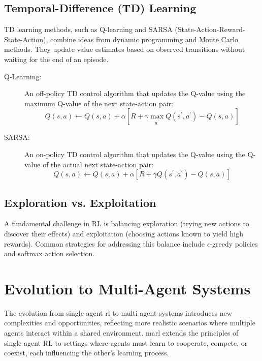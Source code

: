 \subsection*{Temporal-Difference (TD) Learning}
TD learning methods, such as Q-learning and SARSA (State-Action-Reward-State-Action), 
combine ideas from dynamic programming and Monte Carlo methods. They update 
value estimates based on observed transitions without waiting for the end of an episode.
\begin{description}
    \item[Q-Learning:] An off-policy TD control algorithm that updates the Q-value using the 
        maximum Q-value of the next state-action pair:
        \begin{equation}
            Q(s, a) \leftarrow Q(s, a) 
            + \alpha \left[ R + \gamma \max_{a^\prime} Q(s^\prime, a^\prime) - Q(s, a) \right]
        \end{equation}
    \item[SARSA:] An on-policy TD control algorithm that updates the Q-value using the Q-value of 
        the actual next state-action pair:
        \begin{equation}
            Q(s, a) \leftarrow Q(s, a) 
            + \alpha \left[ R + \gamma Q(s^\prime, a^\prime) - Q(s, a) \right]
        \end{equation}
\end{description}

\subsection*{Exploration vs. Exploitation}
A fundamental challenge in RL is balancing exploration (trying new actions to discover their 
effects) and exploitation (choosing actions known to yield high rewards). 
Common strategies for addressing this balance include \(\epsilon\)-greedy policies and 
softmax action selection.

\section{Evolution to Multi-Agent Systems}

The evolution from single-agent \gls{rl} to multi-agent systems introduces new 
complexities and opportunities, reflecting more realistic scenarios where 
multiple agents interact within a shared environment. 
\Gls{marl} extends the principles of single-agent RL to settings where agents must learn to 
cooperate, compete, or coexist, each influencing the other's learning process.

